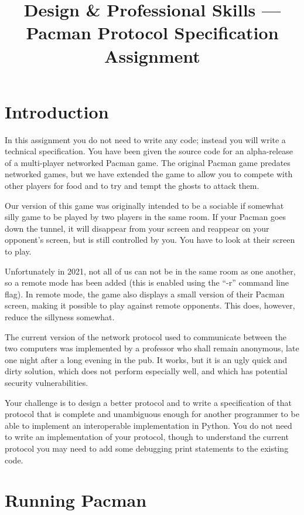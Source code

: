 \documentclass{article}
\title{Design \& Professional Skills --- Pacman Protocol Specification Assignment}
\author{}
\date{}
\begin{document}
\maketitle

\section{Introduction}

In this assignment you do not need to write any code; instead you will
write a technical specification.  You have been given the source code
for an alpha-release of a multi-player networked Pacman game.  The
original Pacman game predates networked games, but we have extended
the game to allow you to compete with other players for food and to
try and tempt the ghosts to attack them.

Our version of this game was originally intended to be a sociable if
somewhat silly game to be played by two players in the same room. If
your Pacman goes down the tunnel, it will disappear from your screen
and reappear on your opponent's screen, but is still controlled by
you.  You have to look at their screen to play.

Unfortunately in 2021, not all of us can not be in the same room as
one another, so a remote mode has been added (this is enabled using
the ``-r'' command line flag).  In remote mode, the game also displays a
small version of their Pacman screen, making it possible to play
against remote opponents. This does, however, reduce the sillyness somewhat.

The current version of the network protocol used to communicate between the
two computers was implemented by a professor who shall remain
anonymous, late one night after a long evening in the pub.  It works,
but it is an ugly quick and dirty solution, which does not perform
especially well, and which has potential security vulnerabilities.

Your challenge is to design a better protocol and to write a
specification of that protocol that is complete and unambiguous enough
for another programmer to be able to implement an interoperable
implementation in Python.  You do not need to write an implementation of your
protocol, though to understand the current protocol you may need to
add some debugging print statements to the existing code.

\section{Running Pacman}
\end{document}
